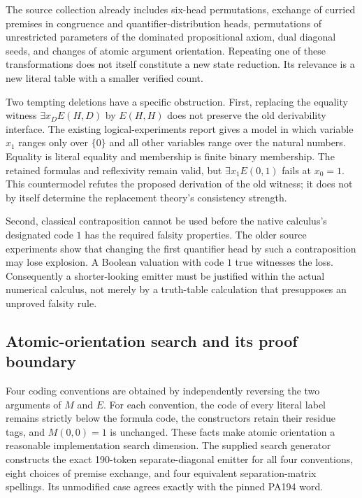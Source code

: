 The source collection already includes six-head permutations, exchange of
curried premises in congruence and quantifier-distribution heads,
permutations of unrestricted parameters of the dominated propositional
axiom, dual diagonal seeds, and changes of atomic argument orientation.
Repeating one of these transformations does not itself constitute a new
state reduction. Its relevance is a new literal table with a smaller
verified count.

Two tempting deletions have a specific obstruction. First, replacing the
equality witness $\exists x_D E(H,D)$ by $E(H,H)$ does not preserve the old
derivability interface. The existing logical-experiments report gives a
model in which variable $x_1$ ranges only over $\{0\}$ and all other
variables range over the natural numbers. Equality is literal equality and
membership is finite binary membership. The retained formulas and
reflexivity remain valid, but $\exists x_1 E(0,1)$ fails at $x_0=1$.
This countermodel refutes the proposed derivation of the old witness;
it does not by itself determine the replacement theory's consistency
strength.

Second, classical contraposition cannot be used before the native
calculus's designated code $1$ has the required falsity properties. The
older source experiments show that changing the first quantifier head by
such a contraposition may lose explosion. A Boolean valuation with code
$1$ true witnesses the loss. Consequently a shorter-looking emitter must
be justified within the actual numerical calculus, not merely by a
truth-table calculation that presupposes an unproved falsity rule.

\subsection{Atomic-orientation search and its proof boundary}

Four coding conventions are obtained by independently reversing the two
arguments of $M$ and $E$. For each convention, the code of every literal
label remains strictly below the formula code, the constructors retain
their residue tags, and $M(0,0)=1$ is unchanged. These facts make atomic
orientation a reasonable implementation search dimension. The supplied
search generator constructs the exact 190-token separate-diagonal emitter
for all four conventions, eight choices of premise exchange, and four
equivalent separation-matrix spellings. Its unmodified case agrees exactly
with the pinned PA194 word.

